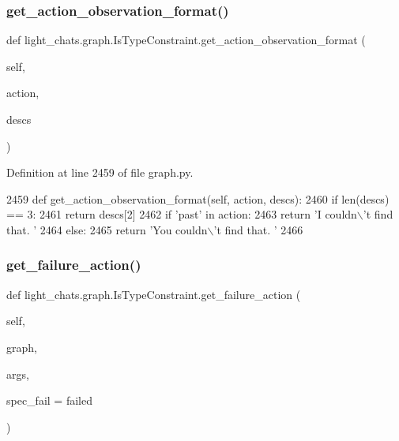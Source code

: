\subsubsection{\texorpdfstring{get\+\_\+action\+\_\+observation\+\_\+format()}{get\_action\_observation\_format()}}
{\footnotesize\ttfamily def light\+\_\+chats.\+graph.\+Is\+Type\+Constraint.\+get\+\_\+action\+\_\+observation\+\_\+format (\begin{DoxyParamCaption}\item[{}]{self,  }\item[{}]{action,  }\item[{}]{descs }\end{DoxyParamCaption})}



Definition at line 2459 of file graph.\+py.


\begin{DoxyCode}
2459     \textcolor{keyword}{def }get\_action\_observation\_format(self, action, descs):
2460         \textcolor{keywordflow}{if} len(descs) == 3:
2461             \textcolor{keywordflow}{return} descs[2]
2462         \textcolor{keywordflow}{if} \textcolor{stringliteral}{'past'} \textcolor{keywordflow}{in} action:
2463             \textcolor{keywordflow}{return} \textcolor{stringliteral}{'I couldn\(\backslash\)'t find that. '}
2464         \textcolor{keywordflow}{else}:
2465             \textcolor{keywordflow}{return} \textcolor{stringliteral}{'You couldn\(\backslash\)'t find that. '}
2466 
\end{DoxyCode}
\mbox{\label{classlight__chats_1_1graph_1_1IsTypeConstraint_a0d16b081fd2f7d73ed7e0414cd518f1e}} 
\subsubsection{\texorpdfstring{get\+\_\+failure\+\_\+action()}{get\_failure\_action()}}
{\footnotesize\ttfamily def light\+\_\+chats.\+graph.\+Is\+Type\+Constraint.\+get\+\_\+failure\+\_\+action (\begin{DoxyParamCaption}\item[{}]{self,  }\item[{}]{graph,  }\item[{}]{args,  }\item[{}]{spec\+\_\+fail = {\ttfamily \textquotesingle{}failed\textquotesingle{}} }\end{DoxyParamCaption})}



